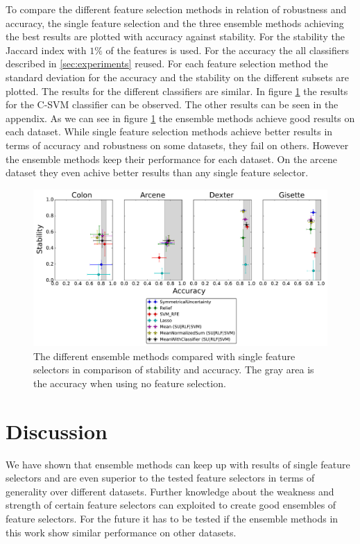 \documentclass[twoside,11pt]{article}
\begin{document}
To compare the different feature selection methods in relation of robustness and accuracy, the single feature selection and the three ensemble methods achieving the best results are plotted with accuracy against stability. For the stability the Jaccard index with $1\%$ of the features is used. For the accuracy the all classifiers described in \ref{sec:experiments}  reused. For each feature selection method the standard deviation for the accuracy and the stability on the different subsets are plotted. The results for the different classifiers are similar. In figure \ref{fig:boxplot_svm} the results for the C-SVM classifier can be observed. The other results can be seen in the appendix. %
As we can see in figure \ref{fig:boxplot_svm} the ensemble methods achieve good results on each dataset. While single feature selection methods achieve better results in terms of accuracy and robustness on some datasets, they fail on others. However the ensemble methods keep their performance for each dataset. On the arcene dataset they even achive better results than any single feature selector.

\begin{figure}[H]
  \centering
    \includegraphics[width=\textwidth]{images/boxplot_svm.pdf}
  \caption{The different ensemble methods compared with single feature selectors in comparison of stability and accuracy.
  The gray area is the accuracy when using no feature selection.}
  \label{fig:boxplot_svm}
\end{figure}

\section{Discussion}
We have shown that ensemble methods can keep up with results of single feature selectors and are even superior to the tested feature selectors in terms of generality over different datasets. Further knowledge about the weakness and strength of certain feature selectors can exploited to create good ensembles of feature selectors. For the future it has to be tested if the ensemble methods in this work show similar performance on other datasets.
\end{document}
